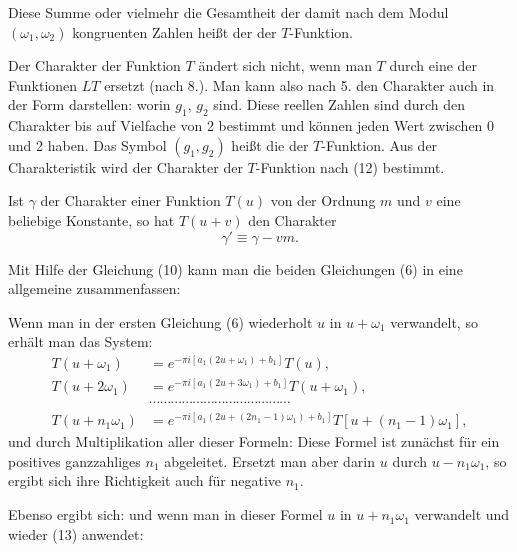Diese Summe oder vielmehr die Gesamtheit der damit nach dem Modul $(\omega_1, \omega_2)$ kongruenten Zahlen heißt der  der $T$-Funktion.

Der Charakter der Funktion $T$ ändert sich nicht, wenn man $T$ durch eine der Funktionen $LT$ ersetzt (nach 8.). Man kann also nach 5. den Charakter auch in der Form darstellen:
worin $g_1$, $g_2$  sind. Diese reellen Zahlen sind durch den Charakter bis auf Vielfache von 2 bestimmt und können jeden Wert zwischen 0 und 2 haben. Das Symbol $(g_1, g_2)$ heißt die  der $T$-Funktion. Aus der Charakteristik wird der Charakter der $T$-Funktion nach (12) bestimmt.

Ist $\gamma$ der Charakter einer Funktion $T(u)$ von der Ordnung $m$ und $v$ eine beliebige Konstante, so hat $T(u+v)$ den Charakter
\[
\gamma' \equiv \gamma - vm.
\]

Mit Hilfe der Gleichung (10) kann man die beiden Gleichungen (6) in eine allgemeine zusammenfassen:

Wenn man in der ersten Gleichung (6) wiederholt $u$ in $u + \omega_1$ verwandelt, so erhält man das System:
\[
\begin{aligned}
T(u+\omega_1) &= e^{-\pi i[a_1(2u+\omega_1)+b_1]}T(u),\\
T(u+2\omega_1) &= e^{-\pi i[a_1(2u+3\omega_1)+b_1]}T(u+\omega_1),\\
&\cdots\cdots\cdots\cdots\cdots\cdots\cdots\cdots\cdots\cdots\cdots\cdots\cdots\\
T(u+n_1\omega_1) &= e^{-\pi i[a_1(2u+(2n_1-1)\omega_1)+b_1]}T[u+(n_1-1)\omega_1],
\end{aligned}
\]
und durch Multiplikation aller dieser Formeln:
Diese Formel ist zunächst für ein positives ganzzahliges $n_1$ abgeleitet. Ersetzt man aber darin $u$ durch $u - n_1\omega_1$, so ergibt sich ihre Richtigkeit auch für negative $n_1$.

Ebenso ergibt sich:
und wenn man in dieser Formel $u$ in $u + n_1\omega_1$ verwandelt und wieder (13) anwendet:
